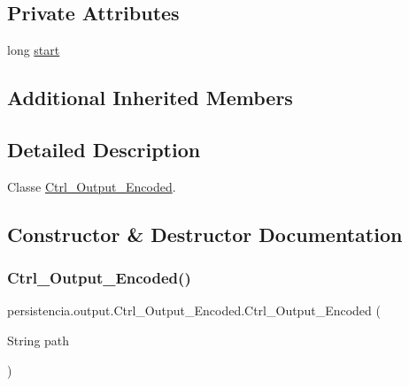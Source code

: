 \subsection*{Private Attributes}
\begin{DoxyCompactItemize}
\item 
long \hyperlink{classpersistencia_1_1output_1_1Ctrl__Output__Encoded_a297adbe95417ad0a03883da607ec6dfe}{start}
\end{DoxyCompactItemize}
\subsection*{Additional Inherited Members}


\subsection{Detailed Description}
Classe \hyperlink{classpersistencia_1_1output_1_1Ctrl__Output__Encoded}{Ctrl\+\_\+\+Output\+\_\+\+Encoded}. 

\subsection{Constructor \& Destructor Documentation}
\mbox{\label{classpersistencia_1_1output_1_1Ctrl__Output__Encoded_adf87a2fd9d945fea928324f09866e889}} 
\subsubsection{\texorpdfstring{Ctrl\+\_\+\+Output\+\_\+\+Encoded()}{Ctrl\_Output\_Encoded()}\hspace{0.1cm}{\footnotesize\ttfamily [1/2]}}
{\footnotesize\ttfamily persistencia.\+output.\+Ctrl\+\_\+\+Output\+\_\+\+Encoded.\+Ctrl\+\_\+\+Output\+\_\+\+Encoded (\begin{DoxyParamCaption}\item[{String}]{path }\end{DoxyParamCaption})\hspace{0.3cm}{\ttfamily [inline]}}



